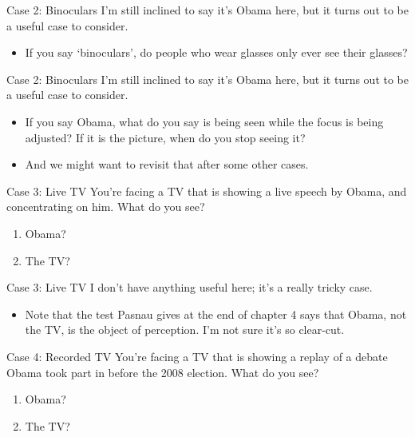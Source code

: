 \documentclass[
  17pt,
  letterpaper,
  ignorenonframetext,
  aspectratio=169,
]{beamer}
\providecommand{\tightlist}{%
  \setlength{\itemsep}{0pt}\setlength{\parskip}{0pt}}\usepackage{longtable,booktabs,array}
\begin{document}
\begin{frame}{Case 2: Binoculars}
\protect\hypertarget{case-2-binoculars-1}{}
I'm still inclined to say it's Obama here, but it turns out to be a
useful case to consider.

\begin{itemize}[<+->]
\tightlist
\item
  If you say `binoculars', do people who wear glasses only ever see
  their glasses?
\end{itemize}
\end{frame}

\begin{frame}{Case 2: Binoculars}
\protect\hypertarget{case-2-binoculars-2}{}
I'm still inclined to say it's Obama here, but it turns out to be a
useful case to consider.

\begin{itemize}[<+->]
\tightlist
\item
  If you say Obama, what do you say is being seen while the focus is
  being adjusted? If it is the picture, when do you stop seeing it?
\item
  And we might want to revisit that after some other cases.
\end{itemize}
\end{frame}

\begin{frame}{Case 3: Live TV}
\protect\hypertarget{case-3-live-tv}{}
You're facing a TV that is showing a live speech by Obama, and
concentrating on him. What do you see?

\begin{enumerate}[<+->]
\tightlist
\item
  Obama?
\item
  The TV?
\end{enumerate}
\end{frame}

\begin{frame}{Case 3: Live TV}
\protect\hypertarget{case-3-live-tv-1}{}
I don't have anything useful here; it's a really tricky case.

\begin{itemize}[<+->]
\tightlist
\item
  Note that the test Pasnau gives at the end of chapter 4 says that
  Obama, not the TV, is the object of perception. I'm not sure it's so
  clear-cut.
\end{itemize}
\end{frame}

\begin{frame}{Case 4: Recorded TV}
\protect\hypertarget{case-4-recorded-tv}{}
You're facing a TV that is showing a replay of a debate Obama took part
in before the 2008 election. What do you see?

\begin{enumerate}[<+->]
\tightlist
\item
  Obama?
\item
  The TV?
\end{enumerate}
\end{frame}
\end{document}

